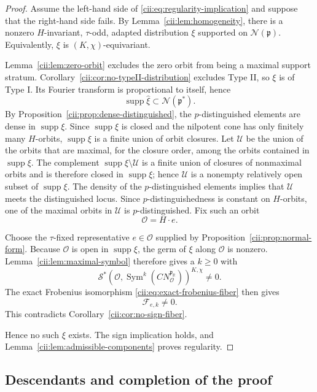 \documentclass[11pt,reqno]{amsart}
\numberwithin{equation}{section}
\theoremstyle{definition}
\theoremstyle{remark}
\newcommand{\R}{\mathbb R}
\newcommand{\Sym}{\operatorname{Sym}}
\newcommand{\supp}{\operatorname{supp}}
\newcommand{\cN}{\mathcal N}
\newcommand{\cS}{\mathcal S}
\begin{document}
\begin{proof}
Assume the left-hand side of
\eqref{cii:eq:regularity-implication} and suppose that the right-hand side
fails.  By Lemma~\ref{cii:lem:homogeneity}, there is a nonzero \(H\)-invariant,
\(\tau\)-odd, adapted distribution \(\xi\) supported on
\(\cN(\mathfrak p)\).  Equivalently, \(\xi\) is
\((K,\chi)\)-equivariant.

Lemma~\ref{cii:lem:zero-orbit} excludes the zero orbit from being a maximal
support stratum.  Corollary~\ref{cii:cor:no-typeII-distribution} excludes Type II, so
\(\xi\) is of Type I.  Its Fourier transform is proportional to itself,
hence
\[
\supp\widehat{\xi}\subset\cN(\mathfrak p^*).
\]
By Proposition~\ref{cii:prop:dense-distinguished},
the \(p\)-distinguished elements are dense in \(\supp\xi\).
Since \(\supp\xi\) is closed and the nilpotent cone has only finitely
many \(H\)-orbits, \(\supp\xi\) is a finite union of orbit closures.
Let \(\mathcal U\) be the union of the orbits that are maximal, for the
closure order, among the orbits contained in \(\supp\xi\).  The complement
\(\supp\xi\setminus\mathcal U\) is a finite union of closures of
nonmaximal orbits and is therefore closed in \(\supp\xi\); hence
\(\mathcal U\) is a nonempty relatively open subset of \(\supp\xi\).
The density of the \(p\)-distinguished elements implies that
\(\mathcal U\) meets the distinguished locus.  Since
\(p\)-distinguishedness is constant on \(H\)-orbits, one of the maximal
orbits in \(\mathcal U\) is \(p\)-distinguished.  Fix such an orbit
\[
  \mathcal O=H\cdot e.
\]

Choose the \(\tau\)-fixed representative
\(e\in\mathcal O\) supplied by Proposition~\ref{cii:prop:normal-form}.
Because \(\mathcal O\) is open in \(\supp\xi\), the germ of \(\xi\)
along \(\mathcal O\) is nonzero.
Lemma~\ref{cii:lem:maximal-symbol} therefore gives a \(k\geq0\) with
\[
  \cS^*\!\left(
    \mathcal O,
    \Sym^k(CN_{\mathcal O}^{\mathfrak p_{\R}})
  \right)^{K,\chi}\neq0.
\]
The exact Frobenius isomorphism \eqref{cii:eq:exact-frobenius-fiber} then gives
\[
  \mathcal F_{e,k}\neq0.
\]
This contradicts Corollary~\ref{cii:cor:no-sign-fiber}.

Hence no such \(\xi\) exists.  The sign implication holds, and
Lemma~\ref{cii:lem:admissible-components} proves regularity.
\end{proof}


\subsection{Descendants and completion of the proof}\label{cii:sec:descendants}
\end{document}
